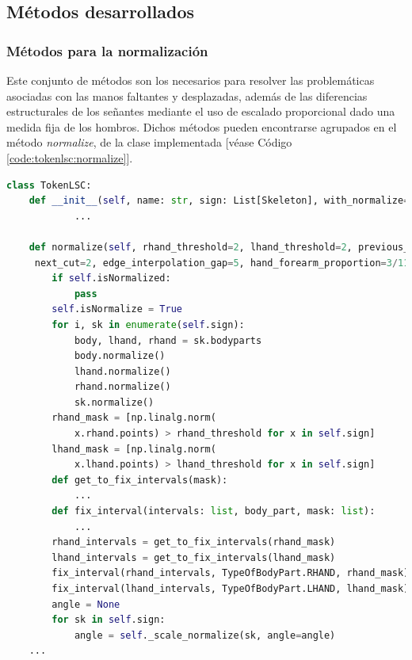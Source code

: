 \subsection{Métodos desarrollados}

\subsubsection{Métodos para la normalización}
Este conjunto de métodos son los necesarios para resolver las problemáticas asociadas con las manos faltantes y desplazadas, además de las diferencias estructurales de los señantes mediante el uso de escalado proporcional dado una medida fija de los hombros. Dichos métodos pueden encontrarse agrupados en el método \textit{normalize}, de la clase implementada [véase Código \ref{code:tokenlsc:normalize}]. 

\begin{lstlisting}[basicstyle=\tiny,language=Python, caption={Método normalize de la clase TokenLSC}, label={code:tokenlsc:normalize}]
class TokenLSC:
    def __init__(self, name: str, sign: List[Skeleton], with_normalize=True, with_crop=True) -> None:
    		...   
    
    def normalize(self, rhand_threshold=2, lhand_threshold=2, previous_cut=2,
     next_cut=2, edge_interpolation_gap=5, hand_forearm_proportion=3/11, finger_proportion=1/0.68):
     	if self.isNormalized:
            pass
        self.isNormalize = True
        for i, sk in enumerate(self.sign):
            body, lhand, rhand = sk.bodyparts
            body.normalize()
            lhand.normalize()
            rhand.normalize()
            sk.normalize()
        rhand_mask = [np.linalg.norm(
            x.rhand.points) > rhand_threshold for x in self.sign]
        lhand_mask = [np.linalg.norm(
            x.lhand.points) > lhand_threshold for x in self.sign]
        def get_to_fix_intervals(mask):
         	...
        def fix_interval(intervals: list, body_part, mask: list):
			...
        rhand_intervals = get_to_fix_intervals(rhand_mask)
        lhand_intervals = get_to_fix_intervals(lhand_mask)
        fix_interval(rhand_intervals, TypeOfBodyPart.RHAND, rhand_mask)
        fix_interval(lhand_intervals, TypeOfBodyPart.LHAND, lhand_mask)
        angle = None
        for sk in self.sign:
            angle = self._scale_normalize(sk, angle=angle)     
	...
\end{lstlisting}

